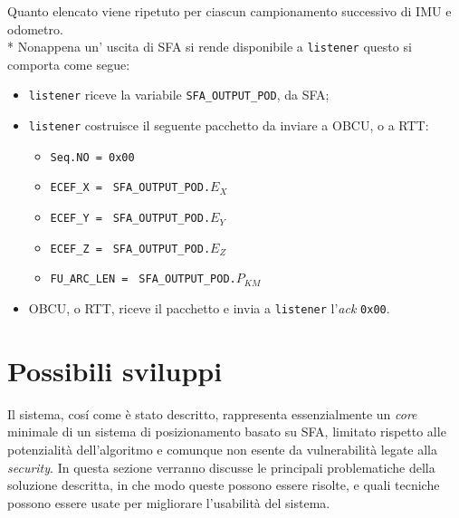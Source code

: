 Quanto elencato viene ripetuto per ciascun campionamento successivo di IMU e odometro.\\*
Nonappena un' uscita di SFA si rende disponibile a \texttt{listener} questo si comporta come segue:
\begin{itemize}
	\item \texttt{listener} riceve la variabile \texttt{SFA\_OUTPUT\_POD}, da SFA;
	\item \texttt{listener} costruisce il seguente pacchetto da inviare a OBCU, o a RTT:
		\begin{itemize}
		\item \texttt{Seq.NO = 0x00}
		\item \texttt{ECEF\_X = } \texttt{SFA\_OUTPUT\_POD.}$E_X$
		\item \texttt{ECEF\_Y = } \texttt{SFA\_OUTPUT\_POD.}$E_Y$
		\item \texttt{ECEF\_Z = } \texttt{SFA\_OUTPUT\_POD.}$E_Z$
		\item \texttt{FU\_ARC\_LEN = } \texttt{SFA\_OUTPUT\_POD.}$P_{KM}$
	\end{itemize}
	\item OBCU, o RTT, riceve il pacchetto e invia a \texttt{listener} l'\emph{ack} \texttt{0x00}.
\end{itemize}
\section{Possibili sviluppi}
Il sistema, cos\'i come \`e stato descritto, rappresenta essenzialmente un \emph{core} minimale di un sistema di posizionamento basato su SFA, limitato rispetto alle potenzialit\`a dell'algoritmo e comunque non esente da vulnerabilit\`a legate alla \emph{security}. In questa sezione verranno discusse le principali problematiche della soluzione descritta, in che modo queste possono essere risolte, e quali tecniche possono essere usate per migliorare l'usabilit\`a del sistema.
